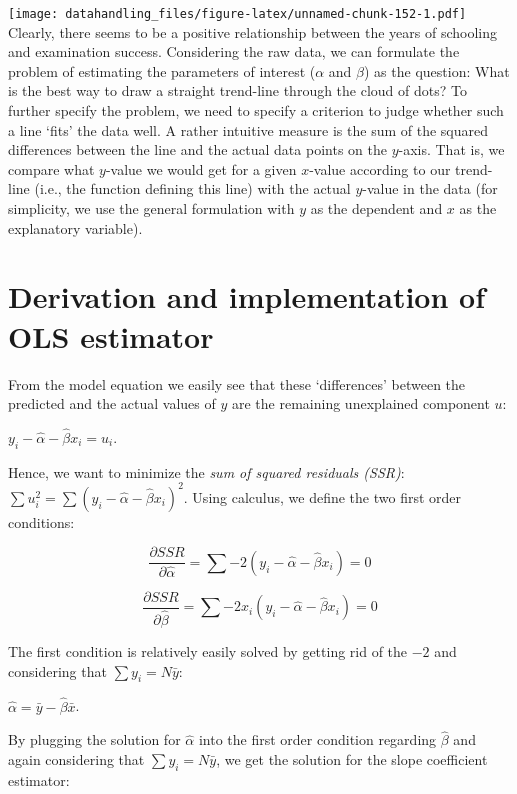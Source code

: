 \documentclass[
  12pt,
]{style/krantz}
\begin{document}
\texttt{[image: datahandling\_files/figure-latex/unnamed-chunk-152-1.pdf]}
Clearly, there seems to be a positive relationship between the years of schooling and examination success. Considering the raw data, we can formulate the problem of estimating the parameters of interest (\(\alpha\) and \(\beta\)) as the question: What is the best way to draw a straight trend-line through the cloud of dots? To further specify the problem, we need to specify a criterion to judge whether such a line `fits' the data well. A rather intuitive measure is the sum of the squared differences between the line and the actual data points on the \(y\)-axis. That is, we compare what \(y\)-value we would get for a given \(x\)-value according to our trend-line (i.e., the function defining this line) with the actual \(y\)-value in the data (for simplicity, we use the general formulation with \(y\) as the dependent and \(x\) as the explanatory variable).

\hypertarget{derivation-and-implementation-of-ols-estimator}{%
\section{Derivation and implementation of OLS estimator}\label{derivation-and-implementation-of-ols-estimator}}

From the model equation we easily see that these `differences' between the predicted and the actual values of \(y\) are the remaining unexplained component \(u\):

\(y_{i}-\hat{\alpha}-\hat{\beta} x_i=u_i\).

Hence, we want to minimize the \emph{sum of squared residuals (SSR)}: \(\sum{u_i^2}=\sum{(y_{i}-\hat{\alpha}-\hat{\beta} x_i)^2}\). Using calculus, we define the two first order conditions:

\[\frac{\partial SSR}{\partial \hat{\alpha}}=\sum{-2(y_{i}-\hat{\alpha}-\hat{\beta} x_i)}=0\]

\[\frac{\partial SSR}{\partial \hat{\beta}}=\sum{-2x_i(y_{i}-\hat{\alpha}-\hat{\beta} x_i)}=0\]

The first condition is relatively easily solved by getting rid of the \(-2\) and considering that \(\sum{y_i}=N\bar{y}\):

\(\hat{\alpha}=\bar{y}-\hat{\beta}\bar{x}\).

By plugging the solution for \(\hat{\alpha}\) into the first order condition regarding \(\hat{\beta}\) and again considering that \(\sum{y_i}=N\bar{y}\), we get the solution for the slope coefficient estimator:
\end{document}

